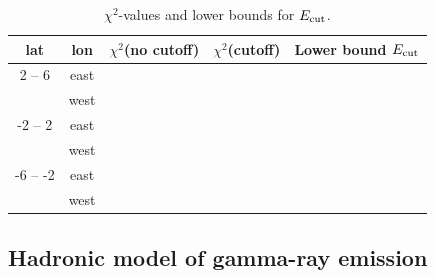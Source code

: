 \begin{table}
  \begin{center}
    \caption{$\chi^2$-values and lower bounds for $E_{\text{cut}}$.}
    \label{tab:IC}
    \begin{tabular}{|c|c|c|c|c|} %
     	\hline
		 lat & lon  & $\chi^2$(no cutoff) &  $\chi^2$(cutoff) & Lower bound $E_{\text{cut}}$ \\ 
		\hline
  		2 -- 6 & east & &   & \\ 
		& west &  &   & \\ 
 		\hline
  		-2 -- 2 & east &  &  &\\ 
		& west & & &\\ 
 		\hline
  		-6 -- -2 & east &  & & \\ 
		& west &  &  &\\ 
 \hline
    \end{tabular}
  \end{center}
\end{table}






\subsection{Hadronic model of gamma-ray emission}
\label{sec:Pion_model}

